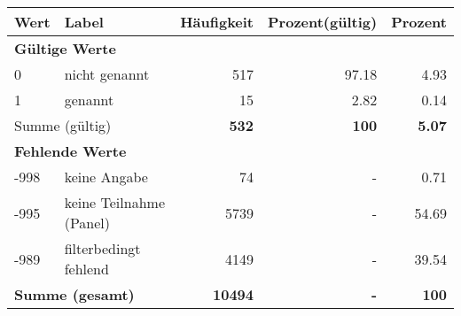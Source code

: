      \begin{longtable}{lXrrr}
     \toprule
     \textbf{Wert} & \textbf{Label} & \textbf{Häufigkeit} & \textbf{Prozent(gültig)} & \textbf{Prozent} \\
     \endhead
     \midrule
     \multicolumn{5}{l}{\textbf{Gültige Werte}}\\

     0 &
     \multicolumn{1}{X}{ nicht genannt   } &


       \num{517} &
       \num[round-mode=places,round-precision=2]{97,18} &
         \num[round-mode=places,round-precision=2]{4,93} \\

     1 &
     \multicolumn{1}{X}{ genannt   } &


       \num{15} &
       \num[round-mode=places,round-precision=2]{2,82} &
         \num[round-mode=places,round-precision=2]{0,14} \\
     \midrule
     \multicolumn{2}{l}{Summe (gültig)} &
       \textbf{\num{532}} &
     \textbf{100} &
       \textbf{\num[round-mode=places,round-precision=2]{5,07}} \\
     \multicolumn{5}{l}{\textbf{Fehlende Werte}}\\
       -998 &
       keine Angabe &
         \num{74} &
        - &
         \num[round-mode=places,round-precision=2]{0,71} \\
       -995 &
       keine Teilnahme (Panel) &
         \num{5739} &
        - &
         \num[round-mode=places,round-precision=2]{54,69} \\
       -989 &
       filterbedingt fehlend &
         \num{4149} &
        - &
         \num[round-mode=places,round-precision=2]{39,54} \\
     \midrule
     \multicolumn{2}{l}{\textbf{Summe (gesamt)}} &
          \textbf{\num{10494}} &
        \textbf{-} &
        \textbf{100} \\
     \bottomrule
     \end{longtable}
     

